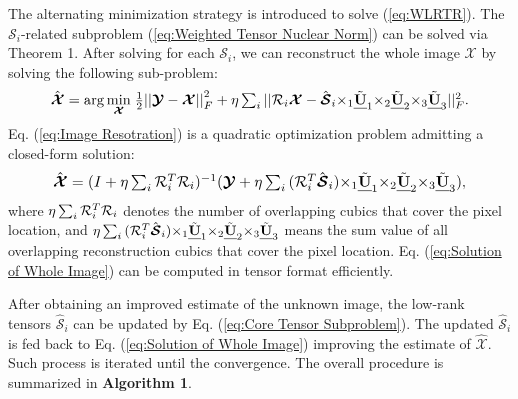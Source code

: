\documentclass[twocolumn]{svjour3}          %
\begin{document}
    The alternating minimization strategy is introduced to solve (\ref{eq:WLRTR}). The ${{\boldsymbol{\mathcal{S}}}_i}$-related subproblem (\ref{eq:Weighted Tensor Nuclear Norm}) can be solved via Theorem 1. After solving for each ${{\boldsymbol{\mathcal{S}}}_i}$, we can reconstruct the whole image ${{\boldsymbol{\mathcal{X}}}}$ by solving the following sub-problem:
    \begin{equation}\label{eq:Image Resotration}
    \begin{aligned}
    \resizebox{0.86\hsize}{!}{${\hat{\boldsymbol{\mathcal{X}}}} = \arg \mathop {\min }\limits_{\boldsymbol{\mathcal{X}}} {\kern 1pt} \frac{1}{2}{\rm{||}}{\boldsymbol{\mathcal{Y}}} - {\boldsymbol{\mathcal{X}}}{\rm{||}}_F^2 + \eta \sum\nolimits_i {||{{\cal R}_i}{\boldsymbol{\mathcal{X}}} - {{\hat{\boldsymbol{\mathcal{S}}}}_i}{ \times _1}{{\tilde{\textbf{\emph{U}}}}_1}{ \times _2}{{\tilde{\textbf{\emph{U}}}}_2}{ \times _3}{{\tilde{\textbf{\emph{U}}}}_3}||_F^2}$}.
    \end{aligned}
     \end{equation}
    Eq. (\ref{eq:Image Resotration}) is a quadratic optimization problem admitting a closed-form solution:
    \begin{equation}\label{eq:Solution of Whole Image}
    \begin{aligned}
    \resizebox{0.85\hsize}{!}{$\hat{\boldsymbol{\mathcal{X}}} = {(I + \eta \sum\nolimits_i {{\cal R}_i^T{{\cal R}_i}} )^{ - 1}}({\boldsymbol{\mathcal{Y}}} + \eta \sum\nolimits_i {({\cal R}_i^T{{\hat{\boldsymbol{\mathcal{S}}}}_i}){ \times _1}{{\tilde{\textbf{\emph{U}}}}_1}{ \times _2}{{\tilde{\textbf{\emph{U}}}}_2}{ \times _3}{{\tilde{\textbf{\emph{U}}}}_3}} )$},
    \end{aligned}
    \end{equation}
    where $\eta \sum\nolimits_i {{\cal R}_i^T{{\cal R}_i}}$ denotes the number of overlapping cubics that cover the pixel location, and $\eta \sum\nolimits_i {({\cal R}_i^T{{\hat{\boldsymbol{\mathcal{S}}}}_i}){ \times _1}{{\tilde{\textbf{\emph{U}}}}_1}{ \times _2}{{\tilde{\textbf{\emph{U}}}}_2}{ \times _3}{{\tilde{\textbf{\emph{U}}}}_3}}$ means the sum value of all overlapping reconstruction cubics that cover the pixel location. Eq. (\ref{eq:Solution of Whole Image}) can be computed in tensor format efficiently.

    After obtaining an improved estimate of the unknown image, the low-rank tensors ${\hat{\boldsymbol{\mathcal{S}}}_i}$ can be updated by Eq. (\ref{eq:Core Tensor Subproblem}). The updated ${\hat{\boldsymbol{\mathcal{S}}}_i}$ is fed back to Eq. (\ref{eq:Solution of Whole Image}) improving the estimate of $\hat{\boldsymbol{\mathcal{X}}}$. Such process is iterated until the convergence. The overall procedure is summarized in \textbf{Algorithm 1}.
\end{document}
